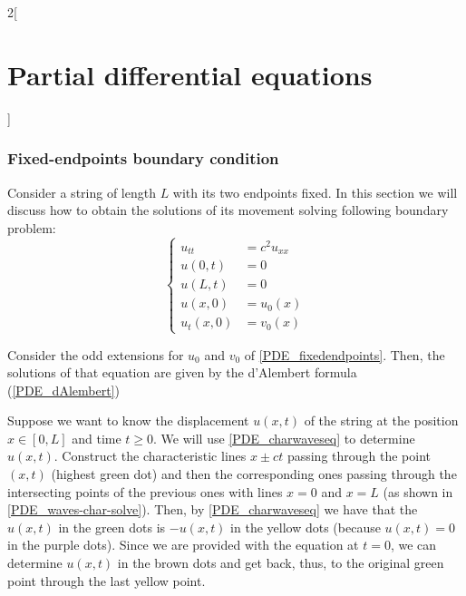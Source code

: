 \documentclass[../../../main_math.tex]{subfiles}
\begin{document}
\begin{multicols}{2}[\section{Partial differential equations}]
  \subsubsection*{Fixed-endpoints boundary condition}
  \begin{definition}
    Consider a string of length $L$ with its two endpoints fixed. In this section we will discuss how to obtain the solutions of its movement solving following boundary problem:
    \begin{equation}\label{PDE_fixedendpoints}
      \left\{
      \begin{aligned}
        u_{tt}   & =c^2u_{xx} \\
        u(0,t)   & =0         \\
        u(L,t)   & =0         \\
        u(x,0)   & =u_0(x)    \\
        u_t(x,0) & =v_0(x)
      \end{aligned}
      \right.
    \end{equation}
  \end{definition}
  \begin{method}
    Consider the odd extensions for $u_0$ and $v_0$ of \cref{PDE_fixedendpoints}. Then, the solutions of that equation are given by the d'Alembert formula (\cref{PDE_dAlembert})
  \end{method}
  \begin{method}\label{PDE_methodchar}
    Suppose we want to know the displacement $u(x,t)$ of the string at the position $x\in[0,L]$ and time $t\geq 0$. We will use \cref{PDE_charwaveseq} to determine $u(x,t)$. Construct the characteristic lines $x\pm ct$ passing through the point $(x,t)$ (highest green dot) and then the corresponding ones passing through the intersecting points of the previous ones with lines $x=0$ and $x=L$ (as shown in \cref{PDE_waves-char-solve}). Then, by \cref{PDE_charwaveseq} we have that the $u(x,t)$ in the green dots is $-u(x,t)$ in the yellow dots (because $u(x,t) = 0$ in the purple dots). Since we are provided with the equation at $t=0$, we can determine $u(x,t)$ in the brown dots and get back, thus, to the original green point through the last yellow point.
  \end{method}
  \begin{center}
    \begin{minipage}{\linewidth}
      \centering
      

\end{minipage}
\end{center}
\end{multicols}
\end{document}

